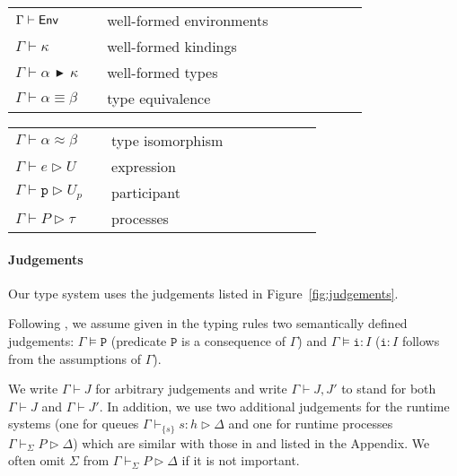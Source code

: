 \documentclass{LMCS}
\newcommand{\kf}[1]{\textup{\textsf{#1}}\xspace}
\newcommand{\e}{\ensuremath{e}}
\newcommand{\participant}[1]{\ensuremath{\mathtt{#1}}}
\newcommand{\p}{\ensuremath{\participant{p}}}
\newcommand{\s}{\ensuremath{s}}
\newcommand{\h}{\ensuremath{h}}
\newcommand{\set}[1]{\ensuremath{\{#1\}}}
\newcommand{\mqueue}[2]{\ensuremath{#1 : #2}}
\newcommand{\queue}{\ensuremath{\h}}
\newcommand{\stdqueue}{\mqueue{\s}{\queue}}
\newcommand{\Ga}{\ensuremath{\Gamma}}
\newcommand{\D}{\ensuremath{\Delta}}
\newcommand{\derqq}[4]{\ensuremath{#1 \vdash_{#2} #3 \triangleright #4}}
\newcommand{\derq}[3]{\ensuremath{#1 \vdash_{\set\s} #2 \triangleright #3}}
\newcommand{\PP}{\ensuremath{P}}
\newcommand{\Env}{\kf{Env}}
\newcommand{\RHD}{\,\ensuremath{\blacktriangleright}\,}
\newcommand{\tii}{\ensuremath{\mathtt{i}}}
\newcommand{\PRED}{\ensuremath{\mathtt{P}}}
\newcommand{\proves}{\vdash}                        \newcommand{\judg}{{J}}
\newcommand{\WB}{\approx}
\newcommand{\ParT}{U_p}
\begin{document}
\begin{figure*}
\center
\begin{tabular}{lllllllll}
$\Ga \proves \Env$ & \quad\quad & well-formed environments\\$\Ga \proves \kappa$ & \quad \quad& well-formed kindings\\$\Ga \proves \alpha\RHD \kappa$ & \quad\quad & well-formed types\\$\Ga \proves \alpha\equiv \beta$ & \quad\quad & type
equivalence\\\end{tabular}\quad 
\begin{tabular}{lllllllll}
$\Ga \proves \alpha\WB \beta$ & \quad\quad & type isomorphism\\$\Ga \proves \e \rhd U$ & \quad\quad & expression\\$\Ga \proves \p \rhd \ParT$ & \quad\quad & participant \\$\Ga \proves \PP \rhd \tau$ & \quad\quad & processes\\\end{tabular}
\caption{Judgements ($\alpha,\beta,...$ range over any types)}\label{fig:judgements}
\end{figure*}

\paragraph{\bf Judgements}
Our type system uses the judgements listed in
Figure~\ref{fig:judgements}.

Following \cite{DBLP:conf/popl/XiP99},  we assume given in the typing rules two
semantically defined judgements: $\Ga \models \PRED$ (predicate $\PRED$ is a
consequence of $\Gamma$) and $\Ga \models \tii : I$ ($\tii : I$ follows from the
assumptions of $\Ga$).

We write $\Gamma \proves \judg$ for arbitrary judgements and 
write $\Gamma \proves \judg,\judg'$ to stand for both 
$\Gamma \proves \judg$ and $\Gamma \proves \judg'$. 
In addition, we use two additional judgements for 
the runtime systems (one for queues $\derq{\Ga}{\stdqueue}{\D}$ and one for 
runtime processes $\derqq{\Ga}{\Sigma}{\PP}{\D}$) which are similar with those 
in \cite{BettiniCDLDY08LONG} and listed in the Appendix. 
We often omit $\Sigma$ from $\derqq{\Ga}{\Sigma}{\PP}{\D}$ if it is
not important.
\end{document}
